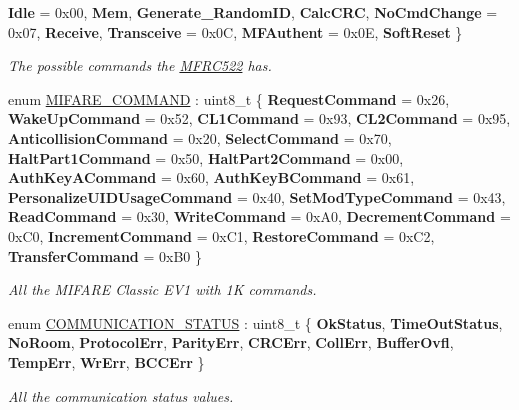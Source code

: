 \begin{DoxyCompactItemize}
{\bfseries Idle} = 0x00, 
{\bfseries Mem}, 
{\bfseries Generate\+\_\+\+Random\+ID}, 
{\bfseries Calc\+C\+RC}, 
\newline
{\bfseries No\+Cmd\+Change} = 0x07, 
{\bfseries Receive}, 
{\bfseries Transceive} = 0x0C, 
{\bfseries M\+F\+Authent} = 0x0E, 
\newline
{\bfseries Soft\+Reset}
 \}
\begin{DoxyCompactList}\small\item\em The possible commands the \mbox{\hyperlink{class_m_f_r_c522}{M\+F\+R\+C522}} has. \end{DoxyCompactList}\item 
enum \mbox{\hyperlink{class_m_f_r_c522_a79bd44224bb1ad85e28a0937a6715818}{M\+I\+F\+A\+R\+E\+\_\+\+C\+O\+M\+M\+A\+ND}} \+: uint8\+\_\+t \{ \newline
{\bfseries Request\+Command} = 0x26, 
{\bfseries Wake\+Up\+Command} = 0x52, 
{\bfseries C\+L1\+Command} = 0x93, 
{\bfseries C\+L2\+Command} = 0x95, 
\newline
{\bfseries Anticollision\+Command} = 0x20, 
{\bfseries Select\+Command} = 0x70, 
{\bfseries Halt\+Part1\+Command} = 0x50, 
{\bfseries Halt\+Part2\+Command} = 0x00, 
\newline
{\bfseries Auth\+Key\+A\+Command} = 0x60, 
{\bfseries Auth\+Key\+B\+Command} = 0x61, 
{\bfseries Personalize\+U\+I\+D\+Usage\+Command} = 0x40, 
{\bfseries Set\+Mod\+Type\+Command} = 0x43, 
\newline
{\bfseries Read\+Command} = 0x30, 
{\bfseries Write\+Command} = 0x\+A0, 
{\bfseries Decrement\+Command} = 0x\+C0, 
{\bfseries Increment\+Command} = 0x\+C1, 
\newline
{\bfseries Restore\+Command} = 0x\+C2, 
{\bfseries Transfer\+Command} = 0x\+B0
 \}
\begin{DoxyCompactList}\small\item\em All the M\+I\+F\+A\+RE Classic E\+V1 with 1K commands. \end{DoxyCompactList}\item 
enum \mbox{\hyperlink{class_m_f_r_c522_a1160642f3b2b60b5ea7309374a8d760a}{C\+O\+M\+M\+U\+N\+I\+C\+A\+T\+I\+O\+N\+\_\+\+S\+T\+A\+T\+US}} \+: uint8\+\_\+t \{ \newline
{\bfseries Ok\+Status}, 
{\bfseries Time\+Out\+Status}, 
{\bfseries No\+Room}, 
{\bfseries Protocol\+Err}, 
\newline
{\bfseries Parity\+Err}, 
{\bfseries C\+R\+C\+Err}, 
{\bfseries Coll\+Err}, 
{\bfseries Buffer\+Ovfl}, 
\newline
{\bfseries Temp\+Err}, 
{\bfseries Wr\+Err}, 
{\bfseries B\+C\+C\+Err}
 \}
\begin{DoxyCompactList}\small\item\em All the communication status values. \end{DoxyCompactList}\end{DoxyCompactItemize}
